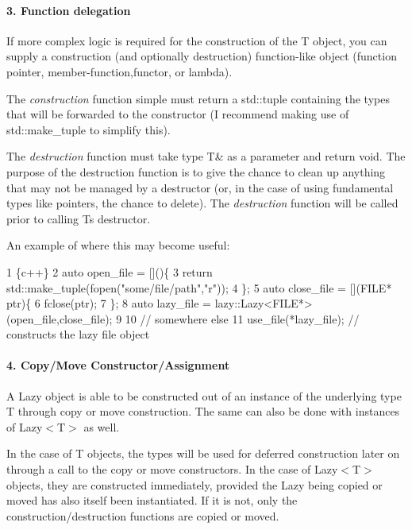 \paragraph*{3. Function delegation}

If more complex logic is required for the construction of the {\ttfamily T} object, you can supply a construction (and optionally destruction) function-\/like object (function pointer, member-\/function,functor, or lambda).

The {\itshape construction} function simple must return a {\ttfamily std\+::tuple} containing the types that will be forwarded to the constructor (I recommend making use of {\ttfamily std\+::make\+\_\+tuple} to simplify this).

The {\itshape destruction} function must take type {\ttfamily T\&} as a parameter and return {\ttfamily void}. The purpose of the destruction function is to give the chance to clean up anything that may not be managed by a destructor (or, in the case of using fundamental types like pointers, the chance to delete). The {\itshape destruction} function will be called prior to calling {\ttfamily T}\textquotesingle{}s destructor.

An example of where this may become useful\+: 
\begin{DoxyCode}
1 \{c++\}
2 auto open\_file = []()\{
3   return std::make\_tuple(fopen("some/file/path","r"));
4 \};
5 auto close\_file = [](FILE* ptr)\{
6   fclose(ptr);
7 \};
8 auto lazy\_file = lazy::Lazy<FILE*>(open\_file,close\_file);
9 
10 // somewhere else
11 use\_file(*lazy\_file); // constructs the lazy file object
\end{DoxyCode}
 \paragraph*{4. Copy/\+Move Constructor/\+Assignment}

A {\ttfamily Lazy} object is able to be constructed out of an instance of the underlying type {\ttfamily T} through copy or move construction. The same can also be done with instances of {\ttfamily Lazy$<$T$>$} as well.

In the case of {\ttfamily T} objects, the types will be used for deferred construction later on through a call to the copy or move constructors. In the case of {\ttfamily Lazy$<$T$>$} objects, they are constructed immediately, provided the {\ttfamily Lazy} being copied or moved has also itself been instantiated. If it is not, only the construction/destruction functions are copied or moved.

